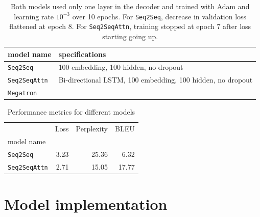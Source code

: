 \documentclass[12pt]{article}
\begin{document}
\begin{landscape}
\begin{table}[tb]
    
    \centering
\begin{tabular}{ll}
\toprule
model name                   &specifications\\
\midrule
\texttt{Seq2Seq} & 100 embedding, 100 hidden, no dropout\\
\texttt{Seq2SeqAttn} & Bi-directional LSTM, 100 embedding, 100 hidden, no dropout\\
\texttt{Megatron}         &  \\
\bottomrule
\end{tabular}
    \caption{Both models used only one layer in the decoder and trained with Adam and learning rate $10^{-3}$ over 10 epochs. For \texttt{Seq2Seq}, decrease in validation loss flattened at epoch 8. For \texttt{Seq2SeqAttn}, training stopped at epoch 7 after loss starting going up.}
    \label{tab:spec}
\end{table}
\begin{table}[h]
\centering
\begin{tabular}{lrrr}
\toprule
{}                                     & Loss  & Perplexity & BLEU \\
model name                             &       &        & \\
\midrule
\texttt{Seq2Seq}                      & 3.23 & 25.36  & 6.32 \\
\texttt{Seq2SeqAttn}                      & 2.71 & 15.05  & 17.77 \\
\bottomrule
\end{tabular}
\caption{Performance metrics for different models}
\label{table:performance}
\end{table}
\end{landscape}




\appendix
\section{Model implementation}





\end{document}
